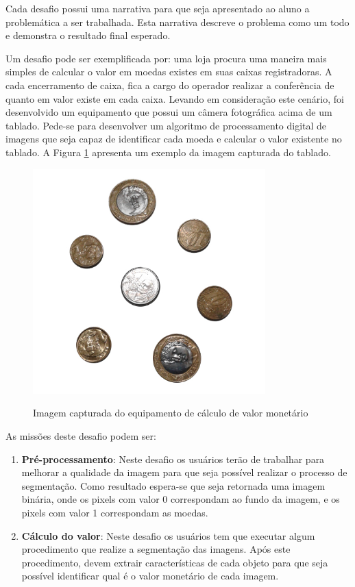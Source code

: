 \documentclass[
	12pt,				%
	oneside,			%
	a4paper,			%
	english,			%
	french,				%
	spanish,			%
	brazil,				%
	]{abntex2}
\begin{document}
Cada desafio possui uma narrativa para que seja apresentado ao aluno a problemática a ser trabalhada. Esta narrativa descreve o problema como um todo e demonstra o resultado final esperado. 

Um desafio pode ser exemplificada por:
uma loja procura uma maneira mais simples de calcular o valor em moedas existes em suas caixas registradoras. A cada encerramento de caixa, fica a cargo do operador realizar a conferência de quanto em valor existe em cada caixa. Levando em consideração este cenário, foi desenvolvido um equipamento que possui um câmera fotográfica acima de um tablado. Pede-se para desenvolver um algoritmo de processamento digital de imagens que seja capaz de identificar cada moeda e calcular o valor existente no tablado. A Figura \ref{fig:exemploNarrativa} apresenta um exemplo da imagem capturada do tablado. 

\begin{figure}[ht]
\centering
\caption{Imagem capturada do equipamento de cálculo de valor monetário}
\includegraphics[width=0.8\textwidth]{imagens/moedas.jpg}
\sourceAuthor
\label{fig:exemploNarrativa}
\end{figure}

As missões deste desafio podem ser:

\begin{enumerate}
\item \textbf{Pré-processamento}: Neste desafio os usuários terão de trabalhar para melhorar a qualidade da imagem para que seja possível realizar o processo de segmentação. Como resultado espera-se que seja retornada uma imagem binária, onde os pixels com valor 0 correspondam ao fundo da imagem, e os pixels com valor 1 correspondam as moedas.
\item \textbf{Cálculo do valor}: Neste desafio os usuários tem que executar algum procedimento que realize a segmentação das imagens. Após este procedimento, devem extrair características de cada objeto para que seja possível identificar qual é o valor monetário de cada imagem.
\end{enumerate}
\end{document}
